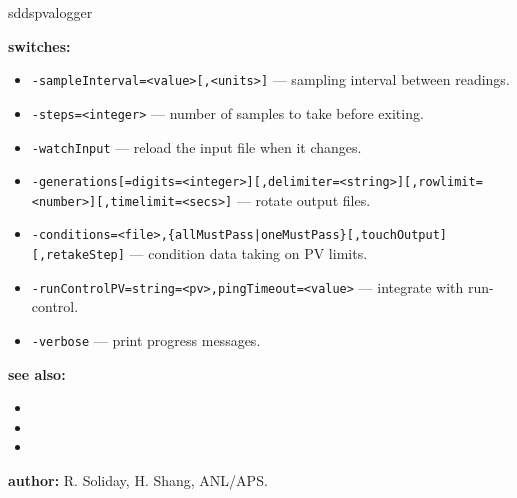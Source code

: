 \begin{sddsprog}{sddspvalogger}
\item \textbf{switches:}
  \begin{itemize}
  \item {\tt -sampleInterval=<value>[,<units>]} --- sampling interval between readings.
  \item {\tt -steps=<integer>} --- number of samples to take before exiting.
  \item {\tt -watchInput} --- reload the input file when it changes.
  \item {\tt -generations[=digits=<integer>][,delimiter=<string>][,rowlimit=<number>][,timelimit=<secs>]} --- rotate output files.
  \item {\tt -conditions=<file>,\{allMustPass|oneMustPass\}[,touchOutput][,retakeStep]} --- condition data taking on PV limits.
  \item {\tt -runControlPV=string=<pv>,pingTimeout=<value>} --- integrate with run-control.
  \item {\tt -verbose} --- print progress messages.
  \end{itemize}

\item \textbf{see also:}
  \begin{itemize}
  \item {}
  \item {}
  \item {}
  \end{itemize}
\item \textbf{author:} R. Soliday, H. Shang, ANL/APS.
\end{sddsprog}
